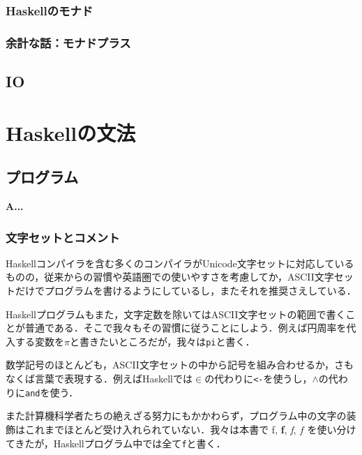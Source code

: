 \documentclass[a5paper,draft]{jsbook}
\newcommand{\programminglanguage}[1]{\textsf{#1}}
\newcommand{\haskell}{\programminglanguage{Haskell}}
\newenvironment{leader}{\begingroup\bf}{\endgroup}
\newcommand{\code}[1]{\texttt{#1}}
\begin{document}
\section{\haskell のモナド}


\section{余計な話：モナドプラス}

\chapter{IO}



\part{\haskell の文法}

\chapter{プログラム}

\begin{leader}
A...
\end{leader}


\section{文字セットとコメント}

\haskell コンパイラを含む多くのコンパイラがUnicode文字セットに対応しているものの，従来からの習慣や英語圏での使いやすさを考慮してか，ASCII文字セットだけでプログラムを書けるようにしているし，またそれを推奨さえしている．

\haskell プログラムもまた，文字定数を除いてはASCII文字セットの範囲で書くことが普通である．そこで我々もその習慣に従うことにしよう．例えば円周率を代入する変数を$\pi$と書きたいところだが，我々は\code{pi}と書く．

数学記号のほとんども，ASCII文字セットの中から記号を組み合わせるか，さもなくば言葉で表現する．例えば\haskell では$\in$の代わりに\code{<-}を使うし，$\wedge$の代わりに\code{and}を使う．

また計算機科学者たちの絶えざる努力にもかかわらず，プログラム中の文字の装飾はこれまでほとんど受け入れられていない．我々は本書で \textrm{f}, \textbf{f}, \textit{f}, $f$ を使い分けてきたが，\haskell プログラム中では全て\code{f}と書く．
\end{document}
